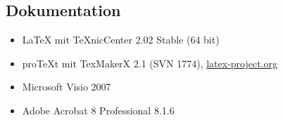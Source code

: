 \subsection*{Dokumentation}\label{dokutools}
\begin{itemize}
  \item \LaTeX{} mit TeXnicCenter 2.02 Stable (64 bit)\cite{TeXnicCenter:2014:Online}
	\item proTeXt mit TexMakerX 2.1 (SVN 1774), \href{http://www.latex-project.org/ftp.html}{latex-project.org}
	\item Microsoft Visio 2007
	\item Adobe Acrobat 8 Professional 8.1.6
\end{itemize}
